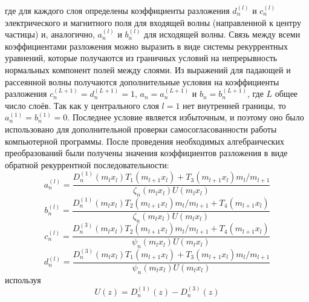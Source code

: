 где для каждого слоя определены коэффициенты разложения $d_n^{(l)}$ и
$c_n^{(l)}$ электрического и магнитного поля для входящей волны
(направленной к центру частицы) и, аналогично, $a_n^{(l)}$ и
$b_n^{(l)}$ для исходящей волны.  Связь между всеми коэффициентами
разложения можно выразить в виде системы рекуррентных уравнений,
которые получаются из граничных условий на непрерывность
нормальных компонент полей между слоями.  Из выражений для падающей
и рассеянной волны получаются дополнительные условия на коэффициенты
разложения $c_n^{(L+1)}=d_n^{(L+1)}=1$, $a_n=a_n^{(L+1)}$ и
$b_n=b_n^{(L+1)}$, где $L$ общее число слоёв. Так как у центрального
слоя $l=1$ нет внутренней границы, то
$a_n^{(1)}=b_n^{(1)}=0$. Последнее условие является избыточным, и
поэтому оно было использовано для дополнительной проверки
самосогласованности работы компьютерной программы.  После проведения
необходимых алгебраических преобразований были получены значения коэффициентов
разложения в виде обратной рекуррентной последовательности:
\begin{equation}
\label{eq:6p1}
a^{(l)}_n = \frac
{
    {D^{(1)}_{n}}{\left (m_{l} x_{l} \right )}
    T_1\left (m_{l+1} x_{l} \right )
    +
    T_3\left (m_{l+1} x_{l} \right )
    m_{l}/m_{l+1}
}
{
   \zeta_{n}\left (m_{l} x_{l} \right )
   U\left (m_{l} x_{l} \right )
}
\end{equation}
\begin{equation}
\label{eq:6p2}
b^{(l)}_n = \frac
{
    {D^{(1)}_{n}}{\left (m_{l} x_{l} \right )}
    T_2\left (m_{l+1} x_{l} \right )
    m_{l}/m_{l+1}
    +
    T_4\left (m_{l+1} x_{l} \right )
}
{
   \zeta_{n}\left (m_{l} x_{l} \right )
   U\left (m_{l} x_{l} \right )
}
\end{equation}
\begin{equation}
\label{eq:6p3}
c^{(l)}_n = \frac
{
    {D^{(3)}_{n}}{\left (m_{l} x_{l} \right )}
    T_2\left (m_{l+1} x_{l} \right )
    m_{l}/m_{l+1}
    +
    T_4\left (m_{l+1} x_{l} \right )
}
{
   \psi_{n}\left (m_{l} x_{l} \right )
   U\left (m_{l} x_{l} \right )
}
\end{equation}
\begin{equation}
\label{eq:6p4}
d^{(l)}_n = \frac
{
    {D^{(3)}_{n}}{\left (m_{l} x_{l} \right )}
    T_1\left (m_{l+1} x_{l} \right )
    +
    T_3\left (m_{l+1} x_{l} \right )
    m_{l}/m_{l+1}
}
{
   \psi_{n}\left (m_{l} x_{l} \right )
   U\left (m_{l} x_{l} \right )
}
\end{equation}
используя
\begin{equation*}
  U(z) =    {D^{(1)}_{n}}(z) - {D^{(3)}_{n}}(z)
\end{equation*}
